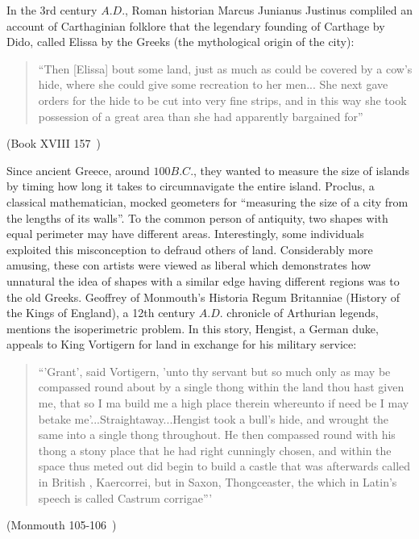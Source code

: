 \documentclass[a4paper]{book}
\numberwithin{theorem}{section}%
\begin{document}
In the 3rd century $A.D.$, Roman historian Marcus Junianus Justinus compliled an account of Carthaginian folklore that the legendary founding of Carthage by Dido, called Elissa by the Greeks (the mythological origin of the city):
\begin{center}
    \begin{quote}
        ``Then [Elissa] bout some land, just as much as could be covered by a cow's hide, where she could give some recreation to her men... She next gave orders for the hide to be cut into very fine strips, and in this way she took possession of a great area than she had apparently bargained for''
    \end{quote}
    (Book XVIII 157~\citep{yardley1994justin})
\end{center}

Since ancient Greece, around $100B.C.$, they wanted to measure the size of islands by timing how long it takes to circumnavigate the entire island. Proclus, a classical mathematician, mocked geometers for ``measuring the size of a city from the lengths of its walls''. To the common person of antiquity, two shapes with equal perimeter may have different areas. Interestingly, some individuals exploited this misconception to defraud others of land. Considerably more amusing, these con artists were viewed as liberal which demonstrates how unnatural the idea of shapes with a similar edge having different regions was to the old Greeks.
\newline
\newline
Geoffrey of Monmouth's Historia Regum Britanniae (History of the Kings of England), a 12th century $A.D.$ chronicle of Arthurian legends, mentions the isoperimetric problem. In this story, Hengist, a German duke, appeals to King Vortigern for land in exchange for his military service:
\begin{center}
    \begin{quote}
        ``'Grant', said Vortigern, 'unto thy servant but so much only as may be compassed round about by a single thong within the land thou hast given me, that so I ma build me a high place therein whereunto if need be I may betake me’...Straightaway...Hengist took a bull’s hide, and wrought the same into a single thong throughout. He then compassed round with his thong a stony place that he had right cunningly chosen, and within the space thus meted out did begin to build a castle that was afterwards called in British , Kaercorrei, but in Saxon, Thongceaster, the which in Latin’s speech is called Castrum corrigae'''
    \end{quote}
    (Monmouth 105-106~\citep{evans1920histories})
\end{center}
\end{document}
